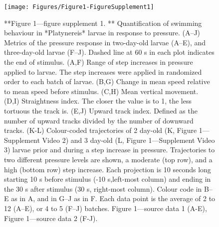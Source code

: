 \documentclass[
]{article}
\begin{document}
\begin{figure}
\texttt{[image: Figures/Figure1-FigureSupplement1]} \caption{**Figure 1—figure supplement 1. ** Quantification of swimming behaviour in *Platynereis* larvae in response to pressure. (A–J) Metrics of the pressure response in two-day-old larvae (A–E), and three-day-old larvae (F–J). Dashed line at 60 s in each plot indicates the end of stimulus. (A,F) Range of step increases in pressure applied to larvae. The step increases were applied in randomized order to each batch of larvae. (B,G) Change in mean speed relative to mean speed before stimulus. (C,H) Mean vertical movement. (D,I) Straightness index. The closer the value is to 1, the less tortuous the track is. (E,J) Upward track index. Defined as the number of upward tracks divided by the number of downward tracks. (K-L) Colour-coded trajectories of 2 day-old (K, Figure 1---Supplement Video 2) and 3 day-old (L, Figure 1---Supplement Video 3) larvae prior and during a step increase in pressure. Trajectories to two different pressure levels are shown, a moderate (top row), and a high (bottom row) step increase. Each projection is 10 seconds long starting 10 s before stimulus (-10 s,left-most column) and ending in the 30 s after stimulus (30 s, right-most column).  Colour code in B–E as in A, and in G–J as in F. Each data point is the average of 2 to 12 (A–E), or 4 to 5 (F–J) batches. Figure 1---source data 1 (A-E), Figure 1---source data 2 (F-J). }\label{fig:unnamed-chunk-7}
\end{figure}
\end{document}
